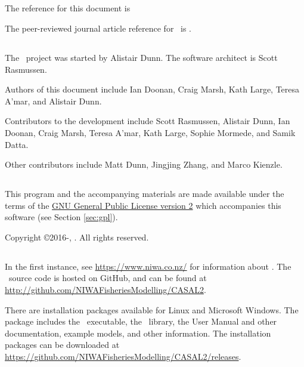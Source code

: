 \subsection{}

The reference for this document is \ManualRef

The peer-reviewed journal article reference for \CNAME\ is \citep{doonan_casal2}.

\subsection{}

The \CNAME~project was started by Alistair Dunn. The software architect is Scott Rasmussen.

Authors of this document include Ian Doonan, Craig Marsh, Kath Large, Teresa A'mar, and Alistair Dunn.

Contributors to the development include Scott Rasmussen, Alistair Dunn, Ian Doonan, Craig Marsh, Teresa A'mar, Kath Large, Sophie Mormede, and Samik Datta.

Other contributors include Matt Dunn, Jingjing Zhang, and Marco Kienzle.

\subsection{}

This program and the accompanying materials are made available under the terms of the \href{http://www.opensource.org/licenses/GPL-2.0}{GNU General Public License version 2} which accompanies this software (see Section \ref{sec:gpl}).

Copyright \copyright 2016-\SourceControlYearDoc, \href{https://www.niwa.co.nz}{\Organisation}. All rights reserved.

\subsection{}

In the first instance, see \url{https://www.niwa.co.nz/} for information about \CNAME . The \CNAME\ source code is hosted on GitHub, and can be found at \url{http://github.com/NIWAFisheriesModelling/CASAL2}.

There are installation packages available for Linux and Microsoft Windows.  The package includes the \CNAME\ executable, the \R\ library, the User Manual and other documentation, example models, and other information. The installation packages can be downloaded at \url{https://github.com/NIWAFisheriesModelling/CASAL2/releases}.

